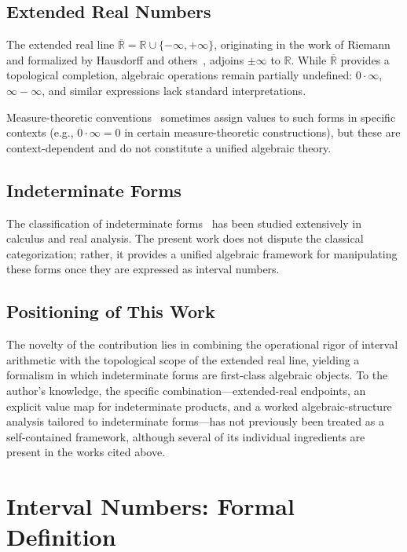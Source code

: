 \documentclass[11pt,a4paper]{article}
\theoremstyle{paperdef}
\newcommand{\Rext}{\overline{\mathbb{R}}}
\begin{document}
\subsection{Extended Real Numbers}

The extended real line $\Rext = \mathbb{R} \cup \{-\infty, +\infty\}$,
originating in the work of Riemann and formalized by Hausdorff and
others~\cite{Folland1999,RockafellarWets1998}, adjoins $\pm\infty$ to
$\mathbb{R}$. While $\Rext$ provides a topological completion,
algebraic operations remain partially undefined: $0 \cdot \infty$,
$\infty - \infty$, and similar expressions lack standard
interpretations.

Measure-theoretic conventions~\cite{Folland1999} sometimes assign
values to such forms in specific contexts (e.g., $0 \cdot \infty = 0$
in certain measure-theoretic constructions), but these are
context-dependent and do not constitute a unified algebraic theory.

\subsection{Indeterminate Forms}

The classification of indeterminate forms~\cite{Apostol1974} has been
studied extensively in calculus and real analysis. The present work
does not dispute the classical categorization; rather, it provides a
unified algebraic framework for manipulating these forms once they are
expressed as interval numbers.

\subsection{Positioning of This Work}

The novelty of the contribution lies in combining the operational
rigor of interval arithmetic with the topological scope of the
extended real line, yielding a formalism in which indeterminate forms
are first-class algebraic objects. To the author's knowledge, the
specific combination---extended-real endpoints, an explicit value map
for indeterminate products, and a worked algebraic-structure analysis
tailored to indeterminate forms---has not previously been treated as
a self-contained framework, although several of its individual
ingredients are present in the works cited above.

\section{Interval Numbers: Formal Definition}\label{sec:interval-numbers}
\end{document}

